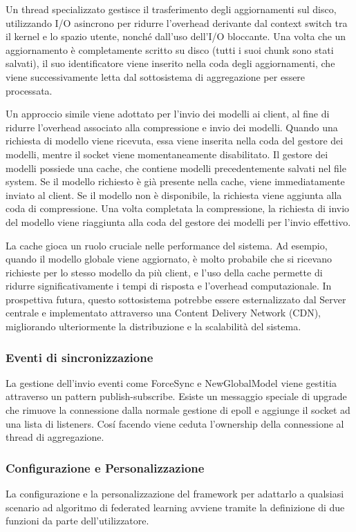 \documentclass[a4paper, oneside, openright]{report}
\begin{document}
Un thread specializzato gestisce il trasferimento degli aggiornamenti sul disco, utilizzando I/O asincrono per ridurre l'overhead derivante dal context switch tra il kernel e lo spazio utente, nonché dall'uso dell'I/O bloccante. Una volta che un aggiornamento è completamente scritto su disco (tutti i suoi chunk sono stati salvati), il suo identificatore viene inserito nella coda degli aggiornamenti, che viene successivamente letta dal sottosistema di aggregazione per essere processata.

Un approccio simile viene adottato per l'invio dei modelli ai client, al fine di ridurre l'overhead associato alla compressione e invio dei modelli. Quando una richiesta di modello viene ricevuta, essa viene inserita nella coda del gestore dei modelli, mentre il socket viene momentaneamente disabilitato. Il gestore dei modelli possiede una cache, che contiene modelli precedentemente salvati nel file system. Se il modello richiesto è già presente nella cache, viene immediatamente inviato al client. Se il modello non è disponibile, la richiesta viene aggiunta alla coda di compressione. Una volta completata la compressione, la richiesta di invio del modello viene riaggiunta alla coda del gestore dei modelli per l'invio effettivo.

La cache gioca un ruolo cruciale nelle performance del sistema. Ad esempio, quando il modello globale viene aggiornato, è molto probabile che si ricevano richieste per lo stesso modello da più client, e l'uso della cache permette di ridurre significativamente i tempi di risposta e l'overhead computazionale. In prospettiva futura, questo sottosistema potrebbe essere esternalizzato dal Server centrale e implementato attraverso una Content Delivery Network (CDN), migliorando ulteriormente la distribuzione e la scalabilità del sistema.

\subsubsection*{Eventi di sincronizzazione}
La gestione dell'invio eventi come ForceSync e NewGlobalModel viene gestitia attraverso un pattern publish-subscribe. Esiste un messaggio speciale di upgrade che rimuove la connessione dalla normale gestione di epoll e aggiunge il socket ad una lista di listeners. Cosí facendo viene ceduta l'ownership della connessione al thread di aggregazione.

\subsubsection*{Configurazione e Personalizzazione}
La configurazione e la personalizzazione del framework per adattarlo a qualsiasi scenario ad algoritmo di federated learning avviene tramite la definizione di due funzioni da parte dell'utilizzatore.
\end{document}
